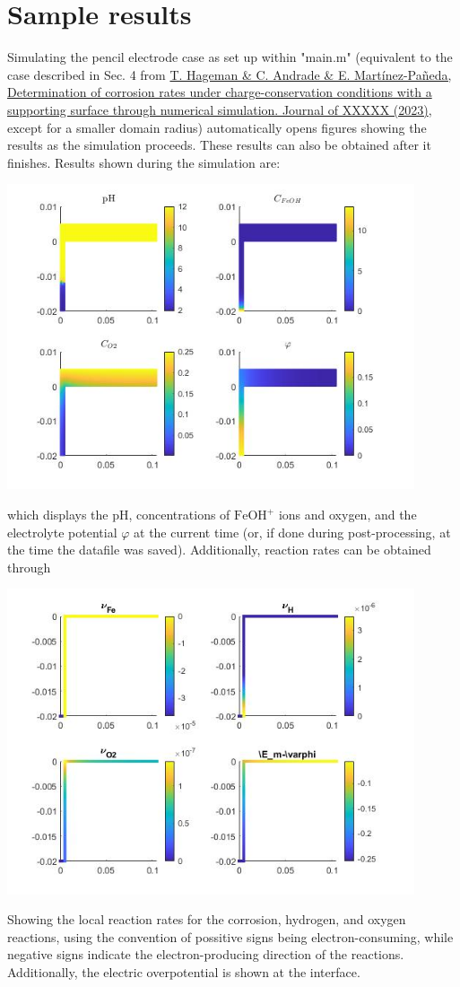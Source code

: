 \documentclass[3p]{elsarticle} %
\newcommand{\citeMe}{\href{DOI HERE}{T. Hageman \& C. Andrade \& E. Martínez-Pañeda, Determination of corrosion rates under charge-conservation conditions with a supporting surface through numerical simulation. Journal of XXXXX (2023)}}
\begin{document}
\section{Sample results}
Simulating the pencil electrode case as set up within "main.m" (equivalent to the case described in Sec. 4 from \citeMe{}, except for a smaller domain radius) automatically opens figures showing the results as the simulation proceeds. These results can also be obtained after it finishes. Results shown during the simulation are:

\begin{center}
\includegraphics[width=12cm]{../Figures/Surfs.jpg}
\end{center}
which displays the pH, concentrations of $\mathrm{FeOH}^+$ ions and oxygen, and the electrolyte potential $\varphi$ at the current time (or, if done during post-processing, at the time the datafile was saved). Additionally, reaction rates can be obtained through

\begin{center}
\includegraphics[width=12cm]{../Figures/Rates.jpg}
\end{center}
Showing the local reaction rates for the corrosion, hydrogen, and oxygen reactions, using the convention of possitive signs being electron-consuming, while negative signs indicate the electron-producing direction of the reactions. Additionally, the electric overpotential is shown at the interface.
\end{document}
